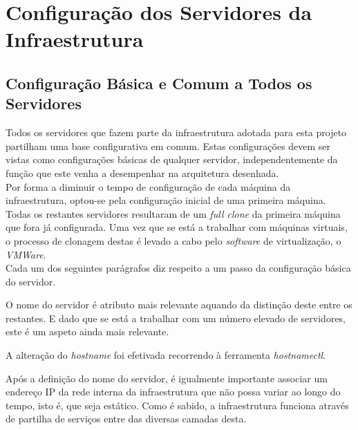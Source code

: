 \section{Configuração dos Servidores da Infraestrutura}

\subsection{Configuração Básica e Comum a Todos os Servidores}

Todos os servidores que fazem parte da infraestrutura adotada para esta projeto partilham uma base configurativa em comum.
Estas configurações devem ser vistas como configurações básicas de qualquer servidor, independentemente da função que este venha a desempenhar na arquitetura desenhada. \\

Por forma a diminuir o tempo de configuração de cada máquina da infraestrutura, optou-se pela configuração inicial de uma primeira máquina.
Todas os restantes servidores resultaram de um \textit{full clone} da primeira máquina que fora já configurada.
Uma vez que se está a trabalhar com máquinas virtuais, o processo de clonagem destas é levado a cabo pelo \textit{software} de virtualização, o \textit{VMWare}. \\

Cada um dos seguintes parágrafos diz respeito a um passo da configuração básica do servidor.


O nome do servidor é atributo mais relevante aquando da distinção deste entre os restantes.
E dado que se está a trabalhar com um número elevado de servidores, este é um aspeto ainda mais relevante.

A alteração do \textit{hostname} foi efetivada recorrendo à ferramenta \textit{hostnamectl}.

\begin{figure}[!hbt]
\end{figure}


Após a definição do nome do servidor, é igualmente importante associar um endereço IP da rede interna da infraestrutura que não possa variar ao longo do tempo, isto é, que seja estático.
Como é sabido, a infraestrutura funciona através de partilha de serviços entre das diversas camadas desta. \\

